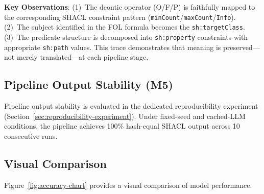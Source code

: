 \textbf{Key Observations}: (1)~The deontic operator (O/F/P) is faithfully mapped to the corresponding SHACL constraint pattern (\texttt{minCount}/\texttt{maxCount}/\texttt{Info}). (2)~The subject identified in the FOL formula becomes the \texttt{sh:targetClass}. (3)~The predicate structure is decomposed into \texttt{sh:property} constraints with appropriate \texttt{sh:path} values. This trace demonstrates that meaning is preserved---not merely translated---at each pipeline stage.

\subsection{Pipeline Output Stability (M5)}
\label{sec:reproducibility-summary}

Pipeline output stability is evaluated in the dedicated reproducibility experiment (Section~\ref{sec:reproducibility-experiment}). Under fixed-seed and cached-LLM conditions, the pipeline achieves 100\% hash-equal SHACL output across 10 consecutive runs.

\subsection{Visual Comparison}

Figure~\ref{fig:accuracy-chart} provides a visual comparison of model performance.

